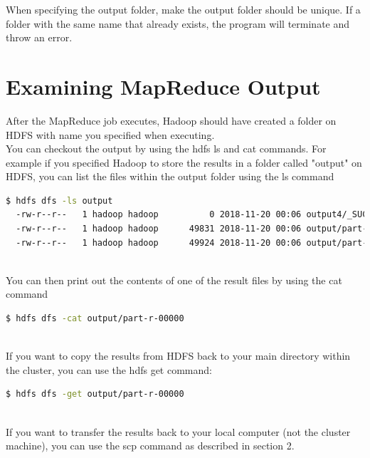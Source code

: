 \documentclass{article}
\begin{document}
\begin{info}
When specifying the output folder, make the output folder should be unique. If a folder with the same name that already exists, the program will terminate and throw an error. 
\end{info}



\section{Examining MapReduce Output}
After the MapReduce job executes, Hadoop should have created a folder on HDFS with name you specified when executing. \\

\noindent You can checkout the output by using the hdfs ls and cat commands.
For example if you specified Hadoop to store the results in a folder called "output" on HDFS, you can list the files within the output folder using the ls command
\begin{lstlisting}[language=bash]
  $ hdfs dfs -ls output
  -rw-r--r--   1 hadoop hadoop          0 2018-11-20 00:06 output4/_SUCCESS
  -rw-r--r--   1 hadoop hadoop      49831 2018-11-20 00:06 output/part-r-00000
  -rw-r--r--   1 hadoop hadoop      49924 2018-11-20 00:06 output/part-r-00001
\end{lstlisting}
\-\ \\You can then print out the contents of one of the result files by using the cat command
\begin{lstlisting}[language=bash]
  $ hdfs dfs -cat output/part-r-00000
\end{lstlisting}
\-\ \\If you want to copy the results from HDFS back to your main directory within the cluster, you can use the hdfs get command:
 \begin{lstlisting}[language=bash]
  $ hdfs dfs -get output/part-r-00000
\end{lstlisting} 
\-\ \\If you want to transfer the results back to your local computer (not the cluster machine), you can use the scp command as described in section 2. 


\end{document}
